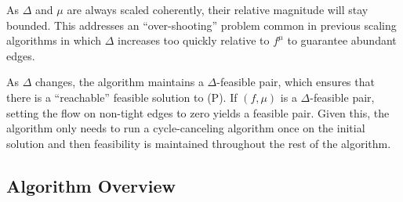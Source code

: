 \documentclass[11pt]{article}
\theoremstyle{definition}
\theoremstyle{definition}
\begin{document}
    As $\Delta$ and $\mu$ are always scaled coherently, their relative magnitude will stay bounded.
    This addresses an ``over-shooting'' problem common in previous scaling algorithms in which $\Delta$
    increases too quickly relative to $f^\mu$ to guarantee abundant edges.
    
    As $\Delta$ changes, the algorithm maintains a $\Delta$-feasible pair, which ensures that there is
    a ``reachable'' feasible solution to (P). If $(f,\mu)$ is a $\Delta$-feasible pair,
    setting the flow on non-tight edges to zero yields a feasible pair.
    Given this, the algorithm only needs to run a cycle-canceling
    algorithm once on the initial solution and then feasibility is maintained throughout the rest of
    the algorithm. 
    
	\subsection{Algorithm Overview} \label{sec:2013-overview}
	
    
\end{document}
